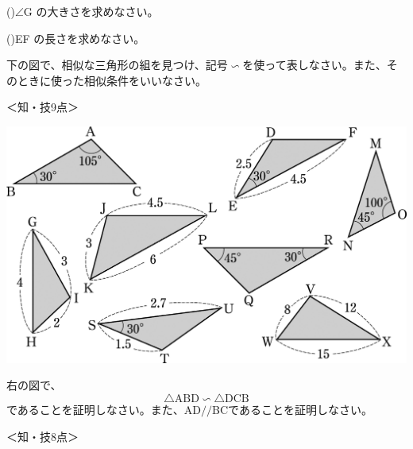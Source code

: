 \documentclass[
  12pt,a4paper,lualatex,ja=standard]{bxjsarticle}
\begin{document}
\begin{flushleft}
()\hspace{2.5pt}$\angle$G の大きさを求めなさい。

\vspace{15mm}

()\hspace{2.5pt}EF の長さを求めなさい。

\vspace{15mm}


\noindent{} \hspace{1pt}下の図で、相似な三角形の組を見つけ、記号$\mathrel{\text{∽}}$を使って表しなさい。また、そのときに使った相似条件をいいなさい。

%
\begin{flushright}%
\footnotesize{＜知・技9点＞}%
\end{flushright}%


\begin{center}
\def\@captype{figure}
\includegraphics{image163.png}

\end{center}

\newpage

\begin{multicols}{2}
\noindent{} \hspace{1pt}右の図で、
$$
\triangle\mbox{ABD} \mathrel{\text{∽}}\triangle\mbox{DCB}
$$
であることを証明しなさい。また、AD$/\!/$BCであることを証明しなさい。

%
\begin{flushright}%
\footnotesize{＜知・技8点＞}%
\end{flushright}%



\end{multicols}
\end{flushleft}
\end{document}
